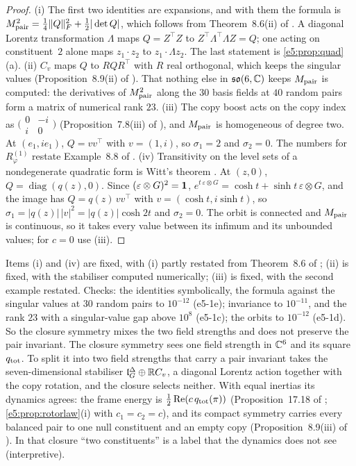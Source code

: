 \begin{proof}
(i) The first two identities are expansions, and with them the formula is $M_{\rm pair}^2=\tfrac14\|Q\|_F^2+\tfrac12|\det Q|$, which follows from
Theorem~8.6(ii) of \cite{RE}. A diagonal Lorentz transformation $\Lambda$ maps $Q=Z^{\!\top}Z$ to $Z^{\!\top}\Lambda^{\!\top}\Lambda Z=Q$; one acting on
constituent~$2$ alone maps $z_1\cdot z_2$ to $z_1\cdot\Lambda z_2$. The last statement is \cref{e5:prop:quad}(a). (ii) $C_v$ maps $Q$ to $RQR^{\!\top}$ with
$R$ real orthogonal, which keeps the singular values (Proposition~8.9(ii) of \cite{RE}). That nothing else in $\mathfrak{so}(6,\mathbb{C})$ keeps $M_{\rm pair}$ is
computed: the derivatives of $M_{\rm pair}^2$ along the $30$ basis fields at $40$ random pairs form a matrix of numerical rank $23$. (iii) The copy
boost acts on the copy index as $\bigl(\begin{smallmatrix}0&-i\\i&0\end{smallmatrix}\bigr)$ (Proposition~7.8(iii) of \cite{RE}), and $M_{\rm pair}$
is homogeneous of degree two. At $(e_1,ie_1)$, $Q=vv^{\!\top}$ with $v=(1,i)$, so $\sigma_1=2$ and $\sigma_2=0$. The numbers for $R^{(1)}_\varphi$
restate Example~8.8 of \cite{RE}. (iv) Transitivity on the level sets of a nondegenerate quadratic form is Witt's theorem \cite{Witt37}. At $(z,0)$,
$Q=\operatorname{diag}(q(z),0)$. Since $(\varepsilon\otimes G)^2=\mathbf 1$, $e^{t\,\varepsilon\otimes G}=\cosh t+\sinh t\,\varepsilon\otimes G$, and the image has
$Q=q(z)\,vv^{\!\top}$ with $v=(\cosh t,i\sinh t)$, so $\sigma_1=|q(z)|\,|v|^2=|q(z)|\cosh2t$ and $\sigma_2=0$. The orbit is connected and $M_{\rm pair}$
is continuous, so it takes every value between its infimum and its unbounded values; for $c=0$ use (iii).
\end{proof}

Items (i) and (iv) are fixed, with (i) partly restated from Theorem~8.6 of \cite{RE}; (ii) is fixed, with the stabiliser computed numerically;
(iii) is fixed, with the second example restated. Checks: the identities symbolically, the formula against the singular values at $30$ random
pairs to $10^{-12}$ (e5-1e); invariance to $10^{-11}$, and the rank $23$ with a singular-value gap above $10^8$ (e5-1c); the orbits to
$10^{-12}$ (e5-1d). So the closure symmetry mixes the two field strengths and does not preserve the pair invariant. The closure symmetry sees one field strength in $\mathbb{C}^6$ and its square $q_{\rm tot}$. To split it into two
field strengths that carry a pair invariant takes the seven-dimensional stabiliser $\mathfrak l_G^\Delta\oplus\mathbb{R} C_v$, a diagonal Lorentz action together
with the copy rotation, and the closure selects neither. With equal inertias its dynamics agrees: the frame energy is $\tfrac12\operatorname{Re}(c\,q_{\rm tot}(\pi))$
(Proposition~17.18 of \cite{ES17}; \cref{e5:prop:rotorlaw}(i) with $c_1=c_2=c$), and its compact symmetry carries every balanced pair to one null constituent and an empty copy (Proposition~8.9(iii)
of \cite{RE}). In that closure ``two constituents'' is a label that the dynamics does not see (interpretive).

